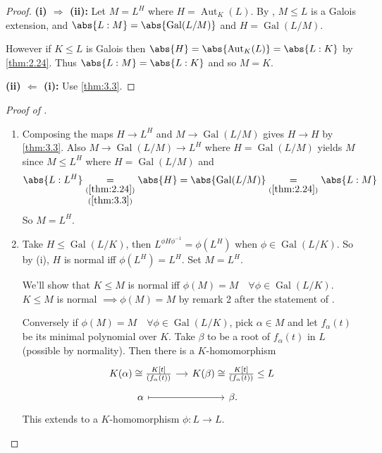 \documentclass{article}
\DeclareMathOperator{\Aut}{Aut}
\DeclareMathOperator{\Gal}{Gal}
\begin{document}
\begin{proof}
    \textbf{(i) $\Rightarrow$ (ii):} Let $M = L^H$ where $H = \Aut_K(L)$.
    By , $M \leq L$ is a Galois extension, and $\abs{L:M} = \abs{\Gal(L/M)}$ and $H = \Gal(L/M)$.

    However if $K \leq L$ is Galois then $\abs{H} = \abs{\Aut_K(L)} = \abs{L:K}$ by \cref{thm:2.24}.
    Thus $\abs{L:M} = \abs{L:K}$ and so $M = K$.

    \textbf{(ii) $\Leftarrow$ (i):} Use \cref{thm:3.3}.
\end{proof}
\begin{proof}[Proof of ]
    \leavevmode
    \begin{enumerate}[label=(\roman*)]
        \item Composing the maps $H \to L^H$ and $M \to \Gal(L /M)$ gives $H \to H$ by \cref{thm:3.3}.
            Also $M \longrightarrow \Gal(L/M) \longrightarrow L^H$ where $H = \Gal(L/M)$ yields $M$ since $M \leq L^H$ where $H = \Gal(L/M)$ and
            \begin{equation*}
                \abs{L:L^H} \underset{\begin{subarray}{c}(\ref{thm:2.24})\\(\ref{thm:3.3})\end{subarray}}{=} \abs{H} = \abs{\Gal(L/M)} \underset{(\ref{thm:2.24})}{=} \abs{L:M}
            \end{equation*}
            So $M = L^H$.
        \item Take $H \leq \Gal(L/K)$, then $L^{\phi H \phi^{-1}} = \phi(L^H)$ when $\phi \in \Gal(L/K)$.
            So by (i), $H$ is normal iff $\phi(L^H) = L^H$. Set $M = L^H$.

            We'll show that $K \leq M$ is normal iff $\phi(M) = M \quad \forall \phi \in \Gal(L/K)$.
            $K \leq M$ is normal $\implies \phi(M) = M$ by remark 2 after the statement of .

            Conversely if $\phi(M) = M \quad \forall \phi \in \Gal(L/K)$, pick $\alpha \in M$ and let $f_\alpha(t)$ be its minimal polynomial over $K$.
            Take $\beta$ to be a root of $f_\alpha(t)$ in $L$ (possible by normality).
            Then there is a $K$-homomorphism
            \begin{equation*}
                \begin{tikzcd}[row sep=tiny, column sep=small]
                    K(\alpha) \cong \frac{K[t]}{(f_\alpha(t))} \ar[r] & K(\beta) \cong \frac{K[t]}{(f_\alpha(t))} \leq L \\
                    \alpha \ar[r, mapsto] & \beta.
                \end{tikzcd}
            \end{equation*}
            This extends to a $K$-homomorphism $\phi:L \to L$.


\end{enumerate}
\end{proof}
\end{document}
